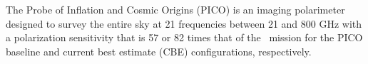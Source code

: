 \documentclass[PICOReport.tex]{subfiles}
\begin{document}





The Probe of Inflation and Cosmic Origins (PICO) is an imaging polarimeter designed to survey the entire sky at 21 frequencies between 21 and 800 GHz with a polarization sensitivity that is 57 or 82 times that of the \planck\ mission for the PICO baseline and current best estimate (\ac{CBE}) configurations, respectively. 
\end{document}
